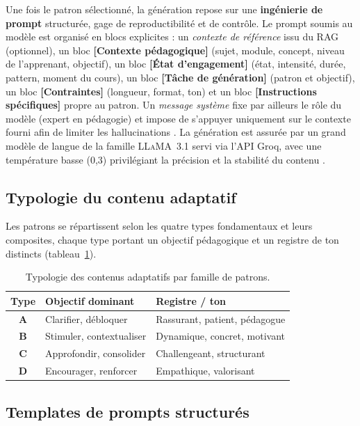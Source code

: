 Une fois le patron sélectionné, la génération repose sur une \textbf{ingénierie de
prompt} structurée, gage de reproductibilité et de contrôle. Le prompt soumis au
modèle est organisé en blocs explicites : un \emph{contexte de référence} issu du
RAG (optionnel), un bloc \textbf{[Contexte pédagogique]} (sujet, module, concept,
niveau de l'apprenant, objectif), un bloc \textbf{[État d'engagement]} (état,
intensité, durée, pattern, moment du cours), un bloc \textbf{[Tâche de
génération]} (patron et objectif), un bloc \textbf{[Contraintes]} (longueur,
format, ton) et un bloc \textbf{[Instructions spécifiques]} propre au patron. Un
\emph{message système} fixe par ailleurs le rôle du modèle (expert en pédagogie)
et impose de s'appuyer uniquement sur le contexte fourni afin de limiter les
hallucinations \cite{lewis2020retrieval}. La génération est assurée par un grand
modèle de langue de la famille \textsc{LLaMA}~3.1 \cite{touvron2023llama} servi
via l'API Groq, avec une température basse (0{,}3) privilégiant la précision et la
stabilité du contenu \cite{brown2020language,kasneci2023chatgpt}.

\subsection{Typologie du contenu adaptatif}

Les patrons se répartissent selon les quatre types fondamentaux et leurs
composites, chaque type portant un objectif pédagogique et un registre de ton
distincts (tableau~\ref{tab:typologie}).

\begin{table}[H]
\centering
\renewcommand{\arraystretch}{1.2}
\begin{tabular}{>{\bfseries}c l l}
\toprule
Type & Objectif dominant & Registre / ton \\
\midrule
A   & Clarifier, débloquer   & Rassurant, patient, pédagogue \\
B   & Stimuler, contextualiser & Dynamique, concret, motivant \\
C   & Approfondir, consolider & Challengeant, structurant \\
D   & Encourager, renforcer  & Empathique, valorisant \\
\bottomrule
\end{tabular}
\caption{Typologie des contenus adaptatifs par famille de patrons.}
\label{tab:typologie}
\end{table}

\subsection{Templates de prompts structurés}

